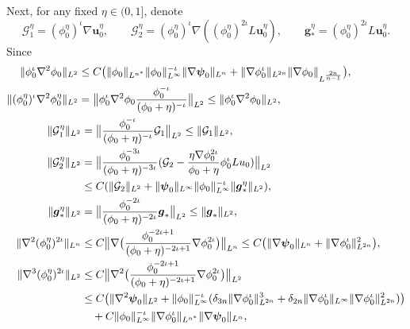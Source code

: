 \documentclass[11pt,reqno]{amsart}
\numberwithin{rk}{section}
\numberwithin{prop}{section}
\numberwithin{mydef}{section}
\numberwithin{lem}{section}
\numberwithin{equation}{section}
\numberwithin{thm}{section}
\begin{document}
Next, for any fixed $\eta\in(0,1]$, denote 
\begin{equation}\label{etainitial}
\mathcal{G}^\eta_1=(\phi^\eta_0)^{\iota}\nabla \boldsymbol{u}^\eta_0,\qquad \mathcal{G}^\eta_2=(\phi^\eta_0)^{\iota}\nabla((\phi^\eta_0)^{2\iota}L\boldsymbol{u}^\eta_0),\qquad 
\boldsymbol{g}^\eta_*=(\phi^\eta_0)^{2\iota}L\boldsymbol{u}^\eta_0.
\end{equation}
 Since
\begin{align}
&\begin{aligned}
\|\phi_0^\iota\nabla^2\phi_0 \|_{L^2}&\leq  C\big(\|\phi_0\|_{L^{n^*}}\|\phi_0\|^{-\iota}_{L^\infty}\|\nabla\boldsymbol{\psi}_0\|_{L^n}+\|\nabla \phi^\iota_0\|_{L^{2n}}\|\nabla \phi_0\|_{L^{\frac{2n}{n-1}}}\big),\notag\\
\|(\phi^\eta_0)^\iota\nabla^2\phi^\eta_0\|_{L^2}&= \big\|\phi_0^\iota\nabla^2\phi_0 \frac{\phi_0^{-\iota}}{(\phi_0+\eta)^{-\iota}}\big\|_{L^2}\leq  \|\phi_0^\iota\nabla^2\phi_0 \|_{L^2},\notag
\end{aligned}\\
&\hspace{13mm}\begin{aligned}
\|\mathcal{G}^\eta_1\|_{L^2}&=\big\|\frac{\phi_0^{-\iota}}{(\phi_0+\eta)^{-\iota}}\mathcal{G}_1\big\|_{L^2}\leq \|\mathcal{G}_1\|_{L^2},\\ 
\|\mathcal{G}^\eta_2\|_{L^2}
&=\big\|\frac{\phi_0^{-3\iota}}{(\phi_0+\eta)^{-3\iota}}(\mathcal{G}_2-\frac{\eta\nabla\phi_0^{2\iota}}{\phi_0+\eta}\phi_0^\iota Lu_0)\big\|_{L^2}\\
&\leq C(\|\mathcal{G}_2\|_{L^2}+\|\boldsymbol{\psi}_0\|_{L^\infty}\|\phi_0\|^{-\iota}_{L^\infty}\|\boldsymbol{g}^\eta_*\|_{L^2}),\\
\|\boldsymbol{g}_*^\eta\|_{L^2}
&=\big\|\frac{\phi_0^{-2\iota}}{(\phi_0+\eta)^{-2\iota}}\boldsymbol{g}_*\big\|_{L^2}\leq \|\boldsymbol{g}_*\|_{L^2},
\end{aligned}\label{initialapproximation}\\
&\hspace{3mm}\begin{aligned}
\|\nabla^2(\phi^\eta_0)^{2\iota}\|_{L^n}
&\leq C\big\|\nabla \big( \frac{\phi_0^{-2\iota+1}}{(\phi_0+\eta)^{-2\iota+1}}\nabla \phi_0^{2\iota}\big)\big\|_{L^n}
\leq  C\big(\|\nabla \boldsymbol{\psi}_0\|_{L^n}+\|\nabla\phi^{\iota}_0 \|^2_{L^{2n}}\big),\notag\\
\|\nabla^3(\phi^\eta_0)^{2\iota}\|_{L^2}
&\leq C\big\|\nabla^2 \big( \frac{\phi_0^{-2\iota+1}}{(\phi_0+\eta)^{-2\iota+1}}\nabla \phi_0^{2\iota}\big)\big\|_{L^2}\notag\\
&\leq  C\big(\|\nabla^2 \boldsymbol{\psi}_0 \|_{L^2}+\|\phi_0\|^{-\iota}_{L^\infty}(\delta_{3n}\|\nabla\phi^{\iota}_0 \|^3_{L^{2n}}+\delta_{2n}\|\nabla\phi^{\iota}_0 \|_{L^{\infty}}\|\nabla\phi^{\iota}_0 \|^2_{L^{2n}})\big)\\
&\quad +C\|\phi_0\|^{-\iota}_{L^\infty}\|\nabla\phi^{\iota}_0 \|_{L^{n^*}}\|\nabla \boldsymbol{\psi}_0 \|_{L^n},\notag    
\end{aligned}
\end{align}
\end{document}
